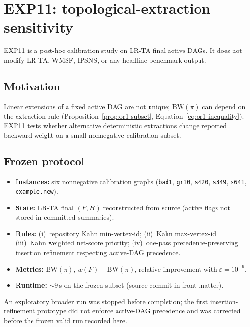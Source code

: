 \section{EXP11: topological-extraction sensitivity}
\label{sec:or1-exp11}

EXP11 is a post-hoc calibration study on LR-TA final active DAGs. It does not modify LR-TA, WMSF, IPSNS, or any headline benchmark output.

\subsection{Motivation}
Linear extensions of a fixed active DAG are not unique; $\mathrm{BW}(\pi)$ can depend on the extraction rule (Proposition~\ref{prop:or1-subset}, Equation~\eqref{eq:or1-inequality}). EXP11 tests whether alternative deterministic extractions change reported backward weight on a small nonnegative calibration subset.

\subsection{Frozen protocol}
\begin{itemize}
    \item \textbf{Instances:} six nonnegative calibration graphs (\texttt{bad1}, \texttt{gr10}, \texttt{s420}, \texttt{s349}, \texttt{s641}, \texttt{example.new}).
    \item \textbf{State:} LR-TA final $(F,H)$ reconstructed from source (active flags not stored in committed summaries).
    \item \textbf{Rules:} (i)~repository Kahn min-vertex-id; (ii)~Kahn max-vertex-id; (iii)~Kahn weighted net-score priority; (iv)~one-pass precedence-preserving insertion refinement respecting active-DAG precedence.
    \item \textbf{Metrics:} $\mathrm{BW}(\pi)$, $w(F)-\mathrm{BW}(\pi)$, relative improvement with $\varepsilon=10^{-9}$.
    \item \textbf{Runtime:} ${\sim}9$\,s on the frozen subset (source commit in front matter).
\end{itemize}

An exploratory broader run was stopped before completion; the first insertion-refinement prototype did not enforce active-DAG precedence and was corrected before the frozen valid run recorded here.

